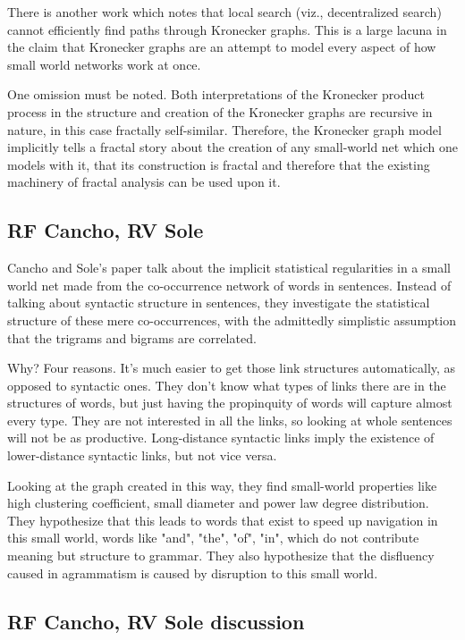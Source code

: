 \documentclass[12pt]{article}
\begin{document}
There is another work which notes that local search (viz., decentralized search) cannot efficiently find paths through Kronecker graphs. This is a large lacuna in the claim that Kronecker graphs are an attempt to model every aspect of how small world networks work at once. %

One omission must be noted. Both interpretations of the Kronecker product process in the structure and creation of the Kronecker graphs are recursive in nature, in this case fractally self-similar. Therefore, the Kronecker graph model implicitly tells a fractal story about the creation of any small-world net which one models with it, that its construction is fractal and therefore that the existing machinery of fractal analysis can be used upon it.

\subsection{RF Cancho, RV Sole}
Cancho and Sole's paper talk about the implicit statistical regularities in a small world net made from the co-occurrence network of words in sentences. Instead of talking about syntactic structure in sentences, they investigate the statistical structure of these mere co-occurrences, with the admittedly simplistic assumption that the trigrams and bigrams are correlated.

Why? Four reasons. It's much easier to get those link structures automatically, as opposed to syntactic ones. They don't know what types of links there are in the structures of words, but just having the propinquity of words will capture almost every type. They are not interested in all the links, so looking at whole sentences will not be as productive. Long-distance syntactic links imply the existence of lower-distance syntactic links, but not vice versa. %

Looking at the graph created in this way, they find small-world properties like high clustering coefficient, small diameter and power law degree distribution. They hypothesize that this leads to words that exist to speed up navigation in this small world, words like "and", "the", "of", "in", which do not contribute meaning but structure to grammar. They also hypothesize that the disfluency caused in agrammatism is caused by disruption to this small world.

\subsection{RF Cancho, RV Sole discussion}
\end{document}

